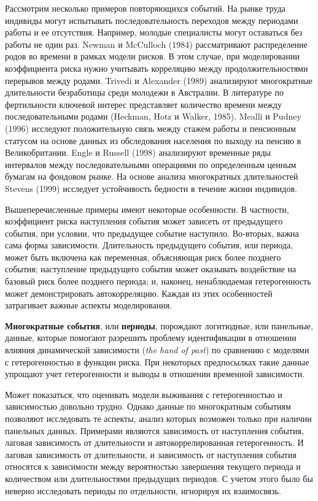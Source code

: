 Рассмотрим несколько примеров повторяющихся событий. На рынке труда индивиды могут испытывать последовательность переходов между периодами работы и ее отсутствия. Например, молодые специалисты могут оставаться без работы не один раз. Newman и McCulloch (1984) рассматривают распределение родов во времени в рамках модели рисков. В этом случае, при моделировании коэффициента риска нужно учитывать корреляцию между продолжительностями перерывов между родами. Trivedi и Alexander (1989) анализируют многократные длительности безработицы среди молодежи в Австралии. В литературе по фертильности ключевой интерес представляет количество времени между последовательными родами (Heckman, Hotz и Walker, 1985). Mealli и Pudney (1996) исследуют положительную связь между стажем работы и пенсионным статусом на основе данных из обследования населения по выходу на пенсию в Великобритании. Engle и Russell (1998) анализируют временные ряды интервалов между последовательными операциями по определенным ценным бумагам на фондовом рынке. На основе анализа многократных длительностей Stevens (1999) исследует устойчивость бедности в течение жизни индивидов.

Вышеперечисленные примеры имеют некоторые особенности. В частности, коэффициент риска наступления события может зависеть от предыдущего события, при условии, что предыдущее событие наступило. Во-вторых, важна сама форма зависимости. Длительность предыдущего события, или периода, может быть включена как переменная, объясняющая риск более позднего события; наступление предыдущего события может оказывать воздействие на базовый риск более позднего периода; и, наконец, ненаблюдаемая гетерогенность может демонстрировать автокорреляцию.
Каждая из этих особенностей затрагивает важные аспекты моделирования.

\textbf{Многократные события}, или \textbf{периоды}, порождают логитюдные, или панельные, данные, которые помогают разрешить проблему идентификации в отношении влияния динамической зависимости (\textit{the hand of past}) по сравнению с моделями с гетерогенностью в функции риска. При некоторых предпосылках такие данные упрощают учет гетерогенности и выводы в отношении временной зависимости.

Может показаться, что оценивать модели выживания с гетерогенностью и зависимостью довольно трудно. Однако данные по многократным событиям позволяют исследовать те аспекты, анализ которых возможен только при наличии панельных данных. Примерами являются зависимость от наступления события, лаговая зависимость от длительности и автокоррелированная гетерогенность. И лаговая зависимость от длительности, и зависимость от наступления события относятся к зависимости между вероятностью завершения текущего периода и количеством или длительностями предыдущих периодов. С учетом этого было бы неверно исследовать периоды по отдельности, игнорируя их взаимосвязь.


